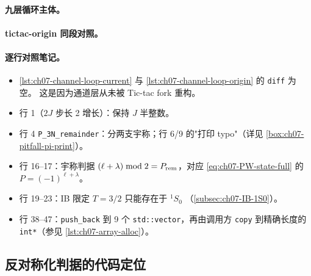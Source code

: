 \paragraph{九层循环主体。}


\paragraph{tictac-origin 同段对照。}


\paragraph{逐行对照笔记。}
\begin{itemize}
  \item \cref{lst:ch07-channel-loop-current} 与
        \cref{lst:ch07-channel-loop-origin} 的 \texttt{diff} 为空。
        这是因为通道层从未被 Tic-tac fork 重构。
  \item 行 1（\(2J\) 步长 2 增长）：保持 \(J\) 半整数。
  \item 行 4 \verb|P_3N_remainder|：分两支宇称；行 6/9 的"打印 typo"（详见
        \cref{box:ch07-pitfall-pi-print}）。
  \item 行 16--17：宇称判据 \((\ell + \lambda) \bmod 2 = P_{\rm rem}\)，对应
        \cref{eq:ch07-PW-state-full} 的 \(P = (-1)^{\ell + \lambda}\)。
  \item 行 19--23：IB 限定 \(T = 3/2\) 只能存在于 \({}^1S_0\)
        （\cref{subsec:ch07-IB-1S0}）。
  \item 行 38--47：\verb|push_back| 到 9 个 \texttt{std::vector}，再由调用方
        \texttt{copy} 到精确长度的 \texttt{int*}（参见
        \cref{lst:ch07-array-alloc}）。
\end{itemize}

\subsection{反对称化判据的代码定位}
\label{subsec:ch07-pauli-code}

